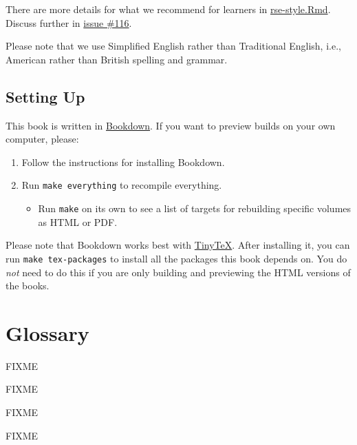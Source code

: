 \documentclass[]{Nemilov}
\providecommand{\tightlist}{%
  \setlength{\itemsep}{0pt}\setlength{\parskip}{0pt}}
\begin{document}
There are more details for what we recommend for learners in
\url{rse-style.Rmd}. Discuss further in \href{https://github.com/merely-useful/merely-useful.github.io/issues/116}{issue \#116}.

Please note that we use Simplified English rather than Traditional English,
i.e., American rather than British spelling and grammar.

\hypertarget{setting-up}{%
\section{Setting Up}\label{setting-up}}

This book is written in \href{https://bookdown.org/}{Bookdown}.
If you want to preview builds on your own computer, please:

\begin{enumerate}
\def\labelenumi{\arabic{enumi}.}
\tightlist
\item
  Follow the instructions for installing Bookdown.
\item
  Run \texttt{make\ everything} to recompile everything.

  \begin{itemize}
  \tightlist
  \item
    Run \texttt{make} on its own to see a list of targets for rebuilding specific volumes as HTML or PDF.
  \end{itemize}
\end{enumerate}

Please note that Bookdown works best with \href{https://yihui.name/tinytex/}{TinyTeX}.
After installing it, you can run \texttt{make\ tex-packages} to install all the packages this book depends on.
You do \emph{not} need to do this if you are only building and previewing the HTML versions of the books.

\hypertarget{glossary}{%
\chapter{Glossary}\label{glossary}}

\begin{description}
\tightlist
\item[\textbf{Abandonware}]
FIXME
\item[\textbf{Absolute error}]
FIXME
\item[\textbf{Absolute path}]
FIXME
\item[\textbf{Accuracy}]
FIXME
\end{description}
\end{document}
